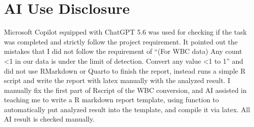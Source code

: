 \documentclass[11pt,letterpaper]{article}
\begin{document}
\section{AI Use Disclosure}\label{ai-use-disclosure}

Microsoft Copilot equipped with ChatGPT 5.6 was used for checking if the
task was completed and strictly follow the project requirement. It
pointed out the mistakes that I did not follow the requirement of ``(For
WBC data) Any count \textless1 in our data is under the limit of
detection. Convert any value \textless1 to 1'' and did not use RMarkdown
or Quarto to finish the report, instead runs a simple R script and write
the report with latex manually with the analyzed result. I manually fix
the first part of Rscript of the WBC conversion, and AI assisted in
teaching me to write a R markdown report template, using function to
automatically put analyzed result into the template, and compile it via
latex. All AI result is checked manually.
\end{document}
